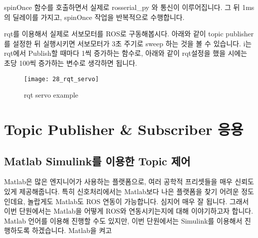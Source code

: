 \documentclass[11pt,fleqn]{book} %
\begin{document}
spinOnce 함수를 호출하면서 실제로 rosserial\_py 와 통신이 이루어집니다. 그 뒤 1ms의 딜레이를 가지고,
spinOnce 작업을 반복적으로 수행합니다.

rqt를 이용해서 실제로 서보모터를 ROS로 구동해봅시다. 아래와 같이 topic publisher를 설정한 뒤 실행시키면 서보모터가 3초 주기로 sweep 하는 것을 볼 수 있습니다.
i는 rqt에서 Publish할 때마다 1씩 증가하는 함수로, 아래와 같이 rqt설정을 했을 시에는 초당 100씩 증가하는 변수로 생각하면 됩니다.

\begin{figure}[h]
\centering\texttt{[image: 28\_rqt\_servo]}
\caption{rqt servo example}
\end{figure}

\section{Topic Publisher \& Subscriber 응용}

\subsection{Matlab Simulink를 이용한 Topic 제어}

Matlab은 많은 엔지니어가 사용하는 플랫폼으로, 여러 공학적 프리셋들을 매우 신뢰도 있게 제공해줍니다. 특히 신호처리에서는 Matlab보다 나은 플랫폼을 찾기 어려운 정도인데요,
놀랍게도 Matlab도 ROS 연동이 가능합니다. 심지어 매우 잘 됩니다. 그래서 이번 단원에서는 Matlab을 어떻게 ROS와 연동시키는지에 대해 이야기하고자 합니다. Matlab 언어를 이용해 진행할 수도 있지만,
이번 단원에서는 Simulink를 이용해서 진행하도록 하겠습니다. Matlab을 켜고 


%
%
%
%
\end{document}
